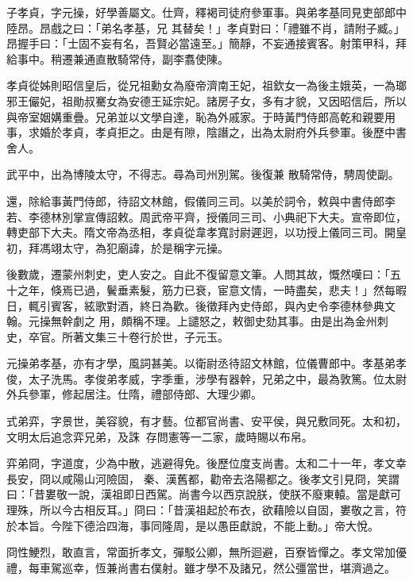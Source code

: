 \begin{pinyinscope}
 子孝貞，字元操，好學善屬文。仕齊，釋褐司徒府參軍事。與弟孝基同見吏部郎中陸昂。昂戲之曰：「弟名孝基，兄
 其替矣！」孝貞對曰：「禮雖不肖，請附子臧。」昂握手曰：「士固不妄有名，吾賢必當遠至。」簡靜，不妄通接賓客。射策甲科，拜給事中。稍遷兼通直散騎常侍，副李翥使陳。



 孝貞從姊則昭信皇后，從兄祖勳女為廢帝濟南王妃，祖欽女一為後主娥英，一為瑯邪王儼妃，祖勛叔騫女為安德王延宗妃。諸房子女，多有才貌，又因昭信后，所以與帝室姻媾重疊。兄弟並以文學自達，恥為外戚家。于時黃門侍郎高乾和親要用事，求婚於孝貞，孝貞拒之。由是有隙，陰譖之，出為太尉府外兵參軍。後歷中書舍人。



 武平中，出為博陵太守，不得志。尋為司州別駕。後復兼
 散騎常侍，騁周使副。



 還，除給事黃門侍郎，待詔文林館，假儀同三司。以美於詞令，敕與中書侍郎李若、李德林別掌宣傳詔敕。周武帝平齊，授儀同三司、小典祀下大夫。宣帝即位，轉吏部下大夫。隋文帝為丞相，孝貞從韋孝寬討尉遲迥，以功授上儀同三司。開皇初，拜馮翊太守，為犯廟諱，於是稱字元操。



 後數歲，遷蒙州刺史，吏人安之。自此不復留意文筆。人問其故，慨然嘆曰：「五十之年，倏焉已過，鬢垂素髮，筋力已衰，宦意文情，一時盡矣，悲夫！」然每暇日，輒引賓客，絃歌對酒，終日為歡。後徵拜內史侍郎，與內史令李德林參典文翰。元操無幹劇之
 用，頗稱不理。上譴怒之，敕御史劾其事。由是出為金州刺史，卒官。所著文集三十卷行於世，子元玉。



 元操弟孝基，亦有才學，風詞甚美。以衛尉丞待詔文林館，位儀曹郎中。孝基弟孝俊，太子洗馬。孝俊弟孝威，字季重，涉學有器幹，兄弟之中，最為敦篤。位太尉外兵參軍，修起居注。仕隋，禮部侍郎、大理少卿。



 式弟弈，字景世，美容貌，有才藝。位都官尚書、安平侯，與兄敷同死。太和初，文明太后追念弈兄弟，及誅，存問憲等一二家，歲時賜以布帛。



 弈弟冏，字道度，少為中散，逃避得免。後歷位度支尚書。太和二十一年，孝文幸長安，冏以咸陽山河險固，
 秦、漢舊都，勸帝去洛陽都之。後孝文引見冏，笑謂曰：「昔婁敬一說，漢祖即日西駕。尚書今以西京說朕，使朕不廢東轅。當是獻可理殊，所以今古相反耳。」冏曰：「昔漢祖起於布衣，欲藉險以自固，婁敬之言，符於本旨。今陛下德洽四海，事同隆周，是以愚臣獻說，不能上動。」帝大悅。



 冏性鯁烈，敢直言，常面折孝文，彈駁公卿，無所迴避，百寮皆憚之。孝文常加優禮，每車駕巡幸，恆兼尚書右僕射。雖才學不及諸兄，然公彊當世，堪濟過之。




\end{pinyinscope}
